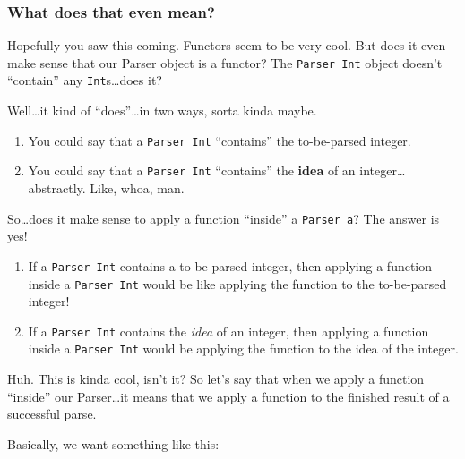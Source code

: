 \documentclass[]{article}
\newenvironment{Shaded}{}{}
\newcommand{\DataTypeTok}[1]{\textcolor[rgb]{0.56,0.13,0.00}{#1}}
\newcommand{\DecValTok}[1]{\textcolor[rgb]{0.25,0.63,0.44}{#1}}
\newcommand{\KeywordTok}[1]{\textcolor[rgb]{0.00,0.44,0.13}{\textbf{#1}}}
\newcommand{\NormalTok}[1]{#1}
\newcommand{\OperatorTok}[1]{\textcolor[rgb]{0.40,0.40,0.40}{#1}}
\newcommand{\OtherTok}[1]{\textcolor[rgb]{0.00,0.44,0.13}{#1}}
\newcommand{\StringTok}[1]{\textcolor[rgb]{0.25,0.44,0.63}{#1}}
\begin{document}
\subsubsection{What does that even mean?}\label{what-does-that-even-mean}

Hopefully you saw this coming. Functors seem to be very cool. But does it even
make sense that our Parser object is a functor? The \texttt{Parser\ Int} object
doesn't ``contain'' any \texttt{Int}s\ldots does it?

Well\ldots it kind of ``does''\ldots in two ways, sorta kinda maybe.

\begin{enumerate}
\def\labelenumi{\arabic{enumi}.}
\tightlist
\item
  You could say that a \texttt{Parser\ Int} ``contains'' the to-be-parsed
  integer.
\item
  You could say that a \texttt{Parser\ Int} ``contains'' the \textbf{idea} of an
  integer\ldots abstractly. Like, whoa, man.
\end{enumerate}

So\ldots does it make sense to apply a function ``inside'' a \texttt{Parser\ a}?
The answer is yes!

\begin{enumerate}
\def\labelenumi{\arabic{enumi}.}
\tightlist
\item
  If a \texttt{Parser\ Int} contains a to-be-parsed integer, then applying a
  function inside a \texttt{Parser\ Int} would be like applying the function to
  the to-be-parsed integer!
\item
  If a \texttt{Parser\ Int} contains the \emph{idea} of an integer, then
  applying a function inside a \texttt{Parser\ Int} would be applying the
  function to the idea of the integer.
\end{enumerate}

Huh. This is kinda cool, isn't it? So let's say that when we apply a function
``inside'' our Parser\ldots it means that we apply a function to the finished
result of a successful parse.

Basically, we want something like this:

\begin{Shaded}
\end{Shaded}
\end{document}
